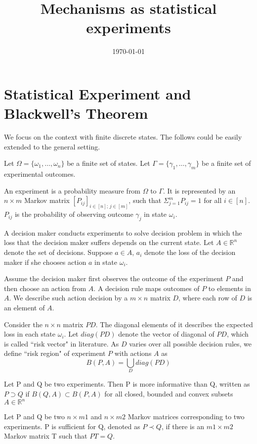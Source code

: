 \documentclass[11pt]{article}
\title{Mechanisms as statistical experiments}
\date{\today}
\begin{document}
\maketitle

\section{Statistical Experiment and Blackwell's Theorem}
We focus on the context with finite discrete states. The follows could be easily extended to the general setting.

Let $\Omega = \{\omega_{1}, \dots, \omega_{n}\}$ be a finite set of states. Let $\Gamma =\{\gamma_{1}, \dots , \gamma_{m}\}$ be a finite set of experimental outcomes. 
\begin{definition}
An experiment is a probability measure from $\Omega$ to $\Gamma$. It is represented by an $n \times m$ Markov matrix $[P_{ij}]_{i\in [n]; \, j\in [m]}$, such that $\Sigma_{j=1}^{m} P_{ij} =1$ for all $i \in [n]$. $P_{ij}$ is the probability of observing outcome $\gamma_{j}$ in state $\omega_{i}$.
\end{definition}

A decision maker conducts experiments to solve decision problem in which the loss that the decision maker suffers depends on the current state. Let $A \in \mathbb{R}^{n}$ denote the set of decisions. Suppose $a \in A$, $a_{i}$ denote the loss of the decision maker if she chooses action $a$ in state $\omega_{i}$.

Assume the decision maker first observes the outcome of the experiment $P$ and then choose an action from $A$. A decision rule maps outcomes of $P$ to elements in $A$. We describe such action decision by a $m \times n$ matrix $D$, where each row of $D$ is an element of $A$.

Consider the $n \times n$ matrix $PD$. The diagonal elements of it describes the expected loss in each state $\omega_{i}$. Let $diag(PD)$ denote the vector of diagonal of $PD$, which is called ``risk vector" in literature. As $D$ varies over all possible decision rules, we define ``risk region" of experiment $P$ with actions $A$ as
\[
B(P,A) = \bigcup_{D} diag(PD)
\]
\begin{definition}
Let P and Q be two experiments. Then P is more informative than Q, written as $P \supset Q$ if $B(Q, A) \subset  B(P, A)$ for all closed, bounded and convex subsets $A \in \mathbb{R}^{n}$
\end{definition}

\begin{definition}
Let P and Q be two $n \times m1$ and $n \times m2$ Markov matrices corresponding to two experiments. P is sufficient for Q, denoted as $P \prec Q$, if there is an $m1 \times m2$ Markov matrix T such that $PT =Q$.
\end{definition}
\end{document}
